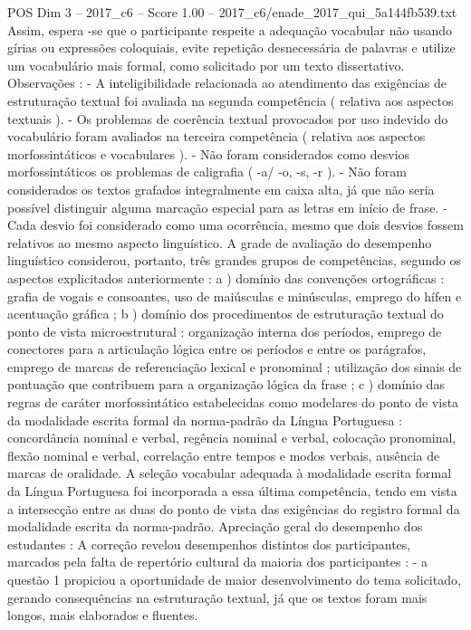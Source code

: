 \begin{textsample}{POS Dim 3 – 2017\_c6 – Score 1.00 – 2017\_c6/enade\_2017\_qui\_5a144fb539.txt}
Assim, espera -se que o participante respeite a adequação vocabular não usando gírias ou expressões coloquiais, evite repetição desnecessária de palavras e utilize um vocabulário mais formal, como solicitado por um texto dissertativo.
Observações : - A inteligibilidade relacionada ao atendimento das exigências de estruturação textual foi avaliada na segunda competência ( relativa aos aspectos textuais ). - Os problemas de coerência textual provocados por uso indevido do vocabulário foram avaliados na terceira competência ( relativa aos aspectos morfossintáticos e vocabulares ). - Não foram considerados como desvios morfossintáticos os problemas de caligrafia ( -a/ -o, -s, -r ). - Não foram considerados os textos grafados integralmente em caixa alta, já que não seria possível distinguir alguma marcação especial para as letras em início de frase. - Cada desvio foi considerado como uma ocorrência, mesmo que dois desvios fossem relativos ao mesmo aspecto linguístico.
A grade de avaliação do desempenho linguístico considerou, portanto, três grandes grupos de competências, segundo os aspectos explicitados anteriormente : a ) domínio das convenções ortográficas : grafia de vogais e consoantes, uso de maiúsculas e minúsculas, emprego do hífen e acentuação gráfica ; b ) domínio dos procedimentos de estruturação textual do ponto de vista microestrutural : organização interna dos períodos, emprego de conectores para a articulação lógica entre os períodos e entre os parágrafos, emprego de marcas de referenciação lexical e pronominal ; utilização dos sinais de pontuação que contribuem para a organização lógica da frase ; c ) domínio das regras de caráter morfossintático estabelecidas como modelares do ponto de vista da modalidade escrita formal da norma-padrão da Língua Portuguesa : concordância nominal e verbal, regência nominal e verbal, colocação pronominal, flexão nominal e verbal, correlação entre tempos e modos verbais, ausência de marcas de oralidade.
A seleção vocabular adequada à modalidade escrita formal da Língua Portuguesa foi incorporada a essa última competência, tendo em vista a intersecção entre as duas do ponto de vista das exigências do registro formal da modalidade escrita da norma-padrão.
Apreciação geral do desempenho dos estudantes : A correção revelou desempenhos distintos dos participantes, marcados pela falta de repertório cultural da maioria dos participantes : - a questão 1 propiciou a oportunidade de maior desenvolvimento do tema solicitado, gerando consequências na estruturação textual, já que os textos foram mais longos, mais elaborados e fluentes.

\end{textsample}
